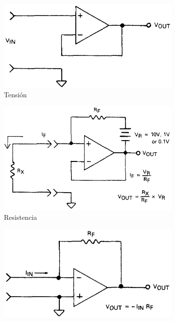 \begin{figure}[p]
    \begin{subfigure}[b]{\textwidth}
    \centering
        \includegraphics{figuras/instrumental/617volts.png}
        \caption{Tensión}
    \end{subfigure}
    \begin{subfigure}[b]{\textwidth}
    \centering
        \includegraphics{figuras/instrumental/617ohms.png}
        \caption{Resistencia}
    \end{subfigure}
    \begin{subfigure}[b]{\textwidth}
    \centering
        \includegraphics{figuras/instrumental/617amps.png}

\end{subfigure}
\end{figure}
